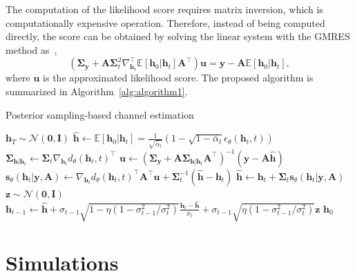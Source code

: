 \documentclass[lettersize,journal]{IEEEtran}
\begin{document}
The computation of the likelihood score requires matrix inversion, which is computationally expensive operation. Therefore, instead of being computed directly, the score can be obtained by solving the linear system with the GMRES method as~\cite{saadGMRESGeneralizedMinimal1986},
\begin{equation}
(\boldsymbol{\Sigma}_{\mathbf{y}}+\mathbf{A}\boldsymbol{\Sigma}_{t}^{2}\nabla_{\mathbf{h}_{t}}^{\top}\mathbb{E}[\mathbf{h}_{0}|\mathbf{h}_{t}]\mathbf{A}^{\top})\mathbf{u} = \mathbf{y}- \mathbf{A}\mathbb{E}[\mathbf{h}_{0}|\mathbf{h}_{t}],
\end{equation}
where $\mathbf{u}$ is the approximated likelihood score. The proposed algorithm is summarized in Algorithm~\ref{alg:algorithm1}.

\begin{algorithm}[!t]
\caption{Posterior sampling-based channel estimation}
\label{alg:algorithm1}
\begin{algorithmic}[1]
\STATE $\mathbf{h}_T \sim \mathcal{N}(\mathbf{0}, \mathbf{I})$
	\STATE $\hat{\mathbf{h}} \gets \mathbb{E}[\mathbf{h}_{0}|\mathbf{h}_{t}] = \frac{1}{\sqrt{ \bar{\alpha}_{t} }}(1-\sqrt{ 1-\bar{\alpha}_{t} }\epsilon_{\theta}(\mathbf{h}_{t},t))$
	\STATE $\boldsymbol{\Sigma}_{\mathbf{h}|\mathbf{h}_{t}} \gets \boldsymbol{\Sigma}_{t} \nabla_{\mathbf{h}_{t}}d_{\theta}(\mathbf{h}_{t},t)^{\top}$
	\STATE $\mathbf{u} \gets (\boldsymbol{\Sigma}_{\mathbf{y}}+\mathbf{A}\boldsymbol{\Sigma}_{\mathbf{h}|\mathbf{h}_{t}}\mathbf{A}^{\top})^{-1}(\mathbf{y}-\mathbf{A}\hat{\mathbf{h}})$
	\STATE $\mathbf{s}_{\theta}(\mathbf{h}_{t}|\mathbf{y},\mathbf{A}) \gets \nabla_{\mathbf{h}_{t}}d_{\theta}(\mathbf{h}_{t},t)^{\top}\mathbf{A}^{\top}\mathbf{u} + \boldsymbol{\Sigma}_{t}^{-1}(\hat{\mathbf{h}}-\mathbf{h}_{t})$
	\STATE $\hat{\mathbf{h}} \gets \mathbf{h}_{t} + \boldsymbol{\Sigma}_{t}\mathbf{s}_{\theta}(\mathbf{h}_{t}|\mathbf{y},\mathbf{A})$
	\STATE $\mathbf{z}\sim\mathcal{N}(\mathbf{0},\mathbf{I})$
	\STATE $\mathbf{h}_{t-1} \gets \hat{\mathbf{h}} + \sigma_{t-1}\sqrt{ 1-\eta( 1- \sigma_{t-1}^{2} /\sigma_{t}^{2} ) }\frac{\mathbf{h}_{t}-\hat{\mathbf{h}}}{\sigma_{t}} + \sigma_{t-1}\sqrt{ \eta( 1- \sigma_{t-1}^{2} / \sigma_{t}^{2}) }\mathbf{z}$
\ENDFOR
\RETURN $\mathbf{h}_{0}$
\end{algorithmic}
\end{algorithm}

\section{Simulations}
\end{document}
